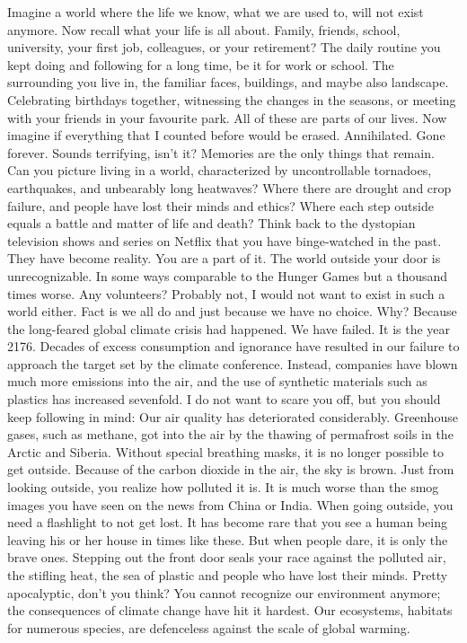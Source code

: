 \documentclass[]{book}
\begin{document}
Imagine a world where the life we know, what we are used to, will not exist anymore. Now recall what your life is all about. Family, friends, school, university, your first job, colleagues, or your retirement? The daily routine you kept doing and following for a long time, be it for work or school. The surrounding you live in, the familiar faces, buildings, and maybe also landscape. Celebrating birthdays together, witnessing the changes in the seasons, or meeting with your friends in your favourite park. All of these are parts of our lives. Now imagine if everything that I counted before would be erased. Annihilated. Gone forever. Sounds terrifying, isn't it? Memories are the only things that remain. Can you picture living in a world, characterized by uncontrollable tornadoes, earthquakes, and unbearably long heatwaves? Where there are drought and crop failure, and people have lost their minds and ethics? Where each step outside equals a battle and matter of life and death? Think back to the dystopian television shows and series on Netflix that you have binge-watched in the past. They have become reality. You are a part of it. The world outside your door is unrecognizable. In some ways comparable to the Hunger Games but a thousand times worse. Any volunteers? Probably not, I would not want to exist in such a world either. Fact is we all do and just because we have no choice. Why? Because the long-feared global climate crisis had happened. We have failed. It is the year 2176. Decades of excess consumption and ignorance have resulted in our failure to approach the target set by the climate conference. Instead, companies have blown much more emissions into the air, and the use of synthetic materials such as plastics has increased sevenfold. I do not want to scare you off, but you should keep following in mind: Our air quality has deteriorated considerably. Greenhouse gases, such as methane, got into the air by the thawing of permafrost soils in the Arctic and Siberia. Without special breathing masks, it is no longer possible to get outside. Because of the carbon dioxide in the air, the sky is brown. Just from looking outside, you realize how polluted it is. It is much worse than the smog images you have seen on the news from China or India. When going outside, you need a flashlight to not get lost. It has become rare that you see a human being leaving his or her house in times like these. But when people dare, it is only the brave ones. Stepping out the front door seals your race against the polluted air, the stifling heat, the sea of plastic and people who have lost their minds. Pretty apocalyptic, don't you think? You cannot recognize our environment anymore; the consequences of climate change have hit it hardest. Our ecosystems, habitats for numerous species, are defenceless against the scale of global warming.
\end{document}
